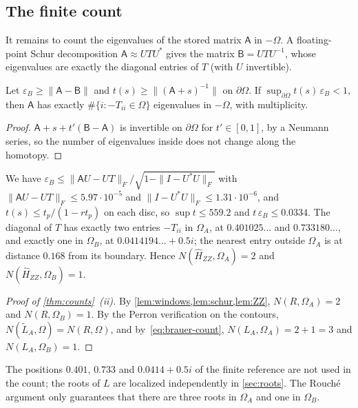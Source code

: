 \subsection{The finite count}\label{sec:counting-finite}

It remains to count the eigenvalues of the stored matrix $\mathsf A$ in $-\Omega$. A floating-point Schur decomposition $\mathsf A\approx UTU^*$ gives the matrix $\mathsf B=UTU^{-1}$,
whose eigenvalues are exactly the diagonal entries of $T$ (with $U$ invertible).

\begin{lemma}\label{lem:schur}
Let $\varepsilon_B\ge\|\mathsf A-\mathsf B\|$ and $t(s)\ge\|(\mathsf A+s)^{-1}\|$ on $\partial\Omega$. If
$\sup_{\partial\Omega}t(s)\,\varepsilon_B<1$, then $\mathsf A$ has exactly $\#\{i:-T_{ii}\in\Omega\}$ eigenvalues
in $-\Omega$, with multiplicity.
\end{lemma}

\begin{proof}
$\mathsf A+s+t'(\mathsf B-\mathsf A)$ is invertible on $\partial\Omega$ for $t'\in[0,1]$, by a Neumann series, so the
number of eigenvalues inside does not change along the homotopy.
\end{proof}

We have $\varepsilon_B\le\|\mathsf AU-UT\|_F/\sqrt{1-\|I-U^*U\|_F}$ with $\|\mathsf AU-UT\|_F\le5.97\cdot10^{-5}$ and
$\|I-U^*U\|_F\le1.31\cdot10^{-6}$, and $t(s)\le t_p/(1-rt_p)$ on each disc, so $\sup t\le559.2$ and
$t\,\varepsilon_B\le0.0334$. The diagonal of $T$ has exactly two entries $-T_{ii}$ in $\Omega_A$, at
$0.401025\ldots$ and $0.733180\ldots$, and exactly one in $\Omega_B$, at $0.0414194\ldots+0.5i$; the nearest
entry outside $\Omega_A$ is at distance $0.168$ from its boundary. Hence $N(\widehat H_{ZZ},\Omega_A)=2$ and
$N(\widehat H_{ZZ},\Omega_B)=1$.

\begin{proof}[Proof of \cref{thm:counts}~(ii)]
By \cref{lem:windows,lem:schur,lem:ZZ}, $N(R,\Omega_A)=2$ and $N(R,\Omega_B)=1$. By the Perron verification on the
contours, $N(\widetilde L_A,\Omega)=N(R,\Omega)$, and by~\eqref{eq:brauer-count},
$N(L_A,\Omega_A)=2+1=3$ and $N(L_A,\Omega_B)=1$.
\end{proof}

The positions $0.401$, $0.733$ and $0.0414+0.5i$ of the finite reference are not used in the count; the roots of
$L$ are localized independently in \cref{sec:roots}. The Rouch\'e argument only guarantees that there are three
roots in $\Omega_A$ and one in $\Omega_B$.
